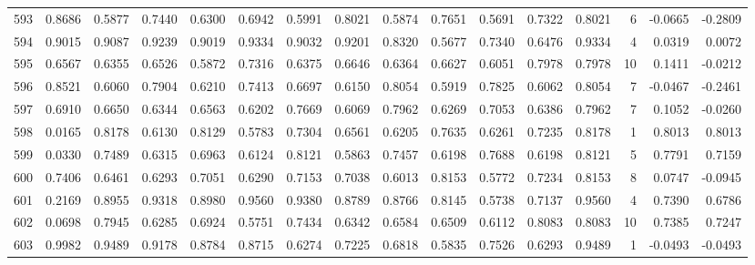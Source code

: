 \begin{tabular}{lrrrrrrrrrrrrrrr}
593 &      0.8686 &  0.5877 &  0.7440 &  0.6300 &  0.6942 &  0.5991 &  0.8021 &  0.5874 &  0.7651 &  0.5691 &   0.7322 &     0.8021 &      6 &                   -0.0665 &                    -0.2809 \\
594 &      0.9015 &  0.9087 &  0.9239 &  0.9019 &  0.9334 &  0.9032 &  0.9201 &  0.8320 &  0.5677 &  0.7340 &   0.6476 &     0.9334 &      4 &                    0.0319 &                     0.0072 \\
595 &      0.6567 &  0.6355 &  0.6526 &  0.5872 &  0.7316 &  0.6375 &  0.6646 &  0.6364 &  0.6627 &  0.6051 &   0.7978 &     0.7978 &     10 &                    0.1411 &                    -0.0212 \\
596 &      0.8521 &  0.6060 &  0.7904 &  0.6210 &  0.7413 &  0.6697 &  0.6150 &  0.8054 &  0.5919 &  0.7825 &   0.6062 &     0.8054 &      7 &                   -0.0467 &                    -0.2461 \\
597 &      0.6910 &  0.6650 &  0.6344 &  0.6563 &  0.6202 &  0.7669 &  0.6069 &  0.7962 &  0.6269 &  0.7053 &   0.6386 &     0.7962 &      7 &                    0.1052 &                    -0.0260 \\
598 &      0.0165 &  0.8178 &  0.6130 &  0.8129 &  0.5783 &  0.7304 &  0.6561 &  0.6205 &  0.7635 &  0.6261 &   0.7235 &     0.8178 &      1 &                    0.8013 &                     0.8013 \\
599 &      0.0330 &  0.7489 &  0.6315 &  0.6963 &  0.6124 &  0.8121 &  0.5863 &  0.7457 &  0.6198 &  0.7688 &   0.6198 &     0.8121 &      5 &                    0.7791 &                     0.7159 \\
600 &      0.7406 &  0.6461 &  0.6293 &  0.7051 &  0.6290 &  0.7153 &  0.7038 &  0.6013 &  0.8153 &  0.5772 &   0.7234 &     0.8153 &      8 &                    0.0747 &                    -0.0945 \\
601 &      0.2169 &  0.8955 &  0.9318 &  0.8980 &  0.9560 &  0.9380 &  0.8789 &  0.8766 &  0.8145 &  0.5738 &   0.7137 &     0.9560 &      4 &                    0.7390 &                     0.6786 \\
602 &      0.0698 &  0.7945 &  0.6285 &  0.6924 &  0.5751 &  0.7434 &  0.6342 &  0.6584 &  0.6509 &  0.6112 &   0.8083 &     0.8083 &     10 &                    0.7385 &                     0.7247 \\
603 &      0.9982 &  0.9489 &  0.9178 &  0.8784 &  0.8715 &  0.6274 &  0.7225 &  0.6818 &  0.5835 &  0.7526 &   0.6293 &     0.9489 &      1 &                   -0.0493 &                    -0.0493 \\

\end{tabular}
